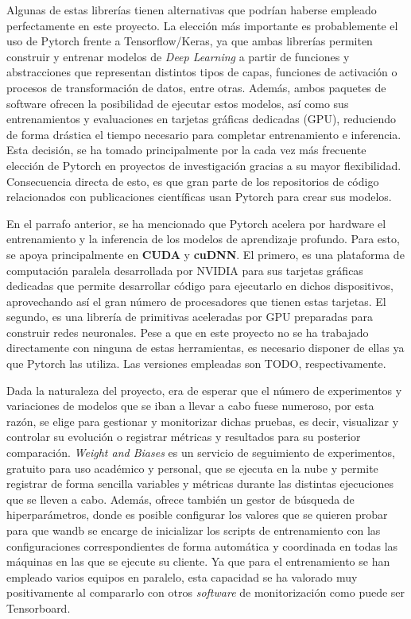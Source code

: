 Algunas de estas librerías tienen alternativas que podrían haberse empleado perfectamente en este proyecto. La elección más importante es probablemente el uso de Pytorch frente a Tensorflow/Keras, ya que ambas librerías permiten construir y entrenar modelos de \textit{Deep Learning} a partir de funciones y abstracciones que representan distintos tipos de capas, funciones de activación o procesos de transformación de datos, entre otras. Además, ambos paquetes de software ofrecen la posibilidad de ejecutar estos modelos, así como sus entrenamientos y evaluaciones en tarjetas gráficas dedicadas (GPU), reduciendo de forma drástica el tiempo necesario para completar entrenamiento e inferencia. Esta decisión, se ha tomado principalmente por la cada vez más frecuente elección de Pytorch en proyectos de investigación gracias a su mayor flexibilidad. Consecuencia directa de esto, es que gran parte de los repositorios de código relacionados con publicaciones científicas usan Pytorch para crear sus modelos.

En el parrafo anterior, se ha mencionado que Pytorch acelera por hardware el entrenamiento y la inferencia de los modelos de aprendizaje profundo. Para esto, se apoya principalmente en \textbf{CUDA} y \textbf{cuDNN}. El primero, es una plataforma de computación paralela desarrollada por NVIDIA para sus tarjetas gráficas dedicadas que permite desarrollar código para ejecutarlo en dichos dispositivos, aprovechando así el gran número de procesadores que tienen estas tarjetas. El segundo, es una librería de primitivas aceleradas por GPU preparadas para construir redes neuronales. Pese a que en este proyecto no se ha trabajado directamente con ninguna de estas herramientas, es necesario disponer de ellas ya que Pytorch las utiliza. Las versiones empleadas son TODO, respectivamente.

Dada la naturaleza del proyecto, era de esperar que el número de experimentos y variaciones de modelos que se iban a llevar a cabo fuese numeroso, por esta razón, se elige  para gestionar y monitorizar dichas pruebas, es decir, visualizar y controlar su evolución o registrar métricas y resultados para su posterior comparación. \textit{Weight and Biases} es un servicio de seguimiento de experimentos, gratuito para uso académico y personal, que se ejecuta en la nube y permite registrar de forma sencilla variables y métricas durante las distintas ejecuciones que se lleven a cabo. Además, ofrece también un gestor de búsqueda de hiperparámetros, donde es posible configurar los valores que se quieren probar para que wandb se encarge de inicializar los scripts de entrenamiento con las configuraciones correspondientes de forma automática y coordinada en todas las máquinas en las que se ejecute su cliente. Ya que para el entrenamiento se han empleado varios equipos en paralelo, esta capacidad se ha valorado muy positivamente al compararlo con otros \textit{software} de monitorización como puede ser Tensorboard.

